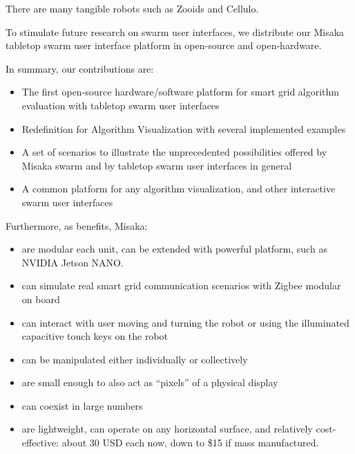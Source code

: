 \documentclass[conference]{IEEEtran}
\begin{document}
There are many tangible robots such as Zooids\cite{le2016zooids} and Cellulo\cite{ozgur2017cellulo}.

To stimulate future research on swarm user interfaces, we distribute our Misaka tabletop swarm user interface platform in open-source and open-hardware.



In summary, our contributions are:

\begin{itemize}
    \item The first open-source hardware/software platform for smart grid algorithm evaluation with tabletop swarm user interfaces
    \item Redefinition for Algorithm Visualization with several implemented examples
    \item A set of scenarios to illustrate the unprecedented possibilities offered by Misaka swarm and by tabletop swarm user interfaces in general
    \item A common platform for any algorithm visualization, and other interactive swarm user interfaces
\end{itemize}

Furthermore, as benefits, Misaka:

\begin{itemize}
    \item are modular each unit, can be extended with powerful platform, such as NVIDIA Jetson NANO.
    \item can simulate real smart grid communication scenarios with Zigbee modular on board
    \item can interact with user moving and turning the robot or using the illuminated capacitive touch keys on the robot 
    \item can be manipulated either individually or collectively
    \item are small enough to also act as “pixels” of a physical display
    \item can coexist in large numbers
    \item are lightweight, can operate on any horizontal surface, and relatively cost-effective: about 30 USD each now, down to \$15 if mass manufactured.
\end{itemize}





\end{document}
